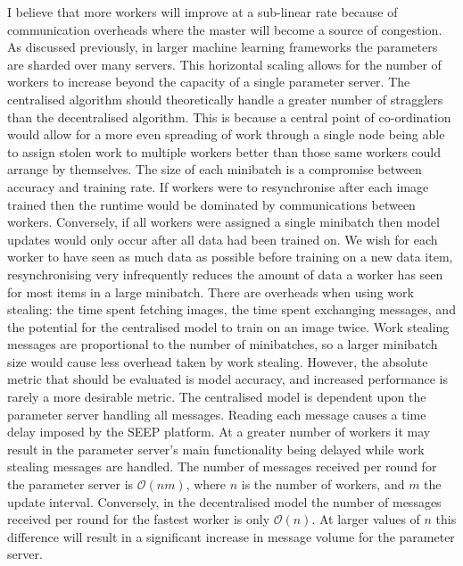 \documentclass[12pt]{article}
\begin{document}
I believe that more workers will improve at a sub-linear rate because of communication overheads where the master will become a source of congestion. As discussed previously, in larger machine learning frameworks the parameters are sharded over many servers. This horizontal scaling allows for the number of workers to increase beyond the capacity of a single parameter server.
\newline
\newline
The centralised algorithm should theoretically handle a greater number of stragglers than the decentralised algorithm. This is because a central point of co-ordination would allow for a more even spreading of work through a single node being able to assign stolen work to multiple workers better than those same workers could arrange by themselves.
\newline
\newline
The size of each minibatch is a compromise between accuracy and training rate. If workers were to resynchronise after each image trained then the runtime would be dominated by communications between workers. Conversely, if all workers were assigned a single minibatch then model updates would only occur after all data had been trained on. We wish for each worker to have seen as much data as possible before training on a new data item, resynchronising very infrequently reduces the amount of data a worker has seen for most items in a large minibatch.
There are overheads when using work stealing: the time spent fetching images, the time spent exchanging messages, and the potential for the centralised model to train on an image twice. Work stealing messages are proportional to the number of minibatches, so a larger minibatch size would cause less overhead taken by work stealing.
However, the absolute metric that should be evaluated is model accuracy, and increased performance is rarely a more desirable metric.
\newline
\newline
The centralised model is dependent upon the parameter server handling all messages. Reading each message causes a time delay imposed by the SEEP platform. At a greater number of workers it may result in the parameter server's main functionality being delayed while work stealing messages are handled. The number of messages received per round for the parameter server is $\mathcal{O}(nm)$, where $n$ is the number of workers, and $m$ the update interval. Conversely, in the decentralised model the number of messages received per round for the fastest worker is only $\mathcal{O}(n)$. At larger values of $n$ this difference will result in a significant increase in message volume for the parameter server.
\end{document}
